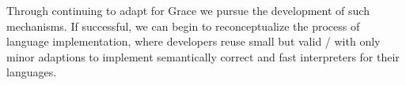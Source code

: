 Through continuing to adapt \SOMns for Grace we pursue the development of such mechanisms. If successful, we can begin to reconceptualize the process of language implementation, where developers reuse small but valid \VMs/ with only minor adaptions to implement semantically correct and fast interpreters for their languages.

%

